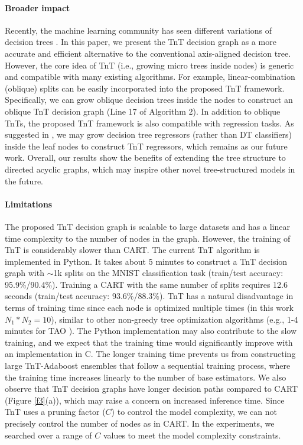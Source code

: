 \documentclass{article}
\begin{document}
\paragraph{Broader impact} Recently, the machine learning community has seen different variations of decision trees \cite{carreira2018alternating, zharmagambetov2020smaller, norouzi2015efficient, kontschieder2015deep, zhu2020resot, hazimeh2020tree,tanno2019adaptive}. In this paper, we present the TnT decision graph as a more accurate and efficient alternative to the conventional axis-aligned decision tree. However, the core idea of TnT (i.e., growing micro trees inside nodes) is generic and compatible with many existing algorithms. For example, linear-combination (oblique) splits can be easily incorporated into the proposed TnT framework. Specifically, we can grow oblique decision trees inside the nodes to construct an oblique TnT decision graph (Line 17 of Algorithm 2). In addition to oblique TnTs, the proposed TnT framework is also compatible with regression tasks. As suggested in \cite{zharmagambetov2020smaller}, we may grow decision tree regressors (rather than DT classifiers) inside the leaf nodes to construct TnT regressors, which remains as our future work. Overall, our results show the benefits of extending the tree structure to directed acyclic graphs, which may inspire other novel tree-structured models in the future.

\vspace{-2mm}
\paragraph{Limitations} 
The proposed TnT decision graph is scalable to large datasets and has a linear time complexity to the number of nodes in the graph. However, the training of TnT is considerably slower than CART. The current TnT algorithm is implemented in Python. It takes about 5 minutes to construct a TnT decision graph with $\sim$1k splits on the MNIST classification task (train/test accuracy: 95.9\%/90.4\%). Training a CART with the same number of splits requires 12.6 seconds (train/test accuracy: 93.6\%/88.3\%). TnT has a natural disadvantage in terms of training time since each node is optimized multiple times (in this work $N_1*N_2=10$),  similar to other non-greedy tree optimization algorithms (e.g., 1-4 minutes for TAO \cite{carreira2018alternating}). The Python implementation may also contribute to the slow training, and we expect that the training time would significantly improve with an implementation in C. The longer training time prevents us from constructing large TnT-Adaboost ensembles that follow a sequential training process, where the training time increases linearly to the number of base estimators. We also observe that TnT decision graphs have longer decision paths compared to CART (Figure \ref{f3}(a)), which may raise a concern on increased inference time. Since TnT uses a pruning factor ($C$) to control the model complexity, we can not precisely control the number of nodes as in CART. In the experiments, we searched over a range of $C$ values to meet the model complexity constraints.
\end{document}
